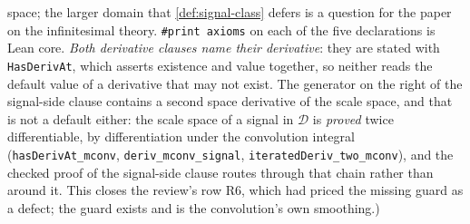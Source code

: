 \begin{proposition}
{space; the larger domain that \ref{def:signal-class} defers is a question for the paper on
the infinitesimal theory. \texttt{\#print axioms} on each of the five declarations is Lean
core. \emph{Both derivative clauses name their derivative}: they are stated with
\texttt{HasDerivAt}, which asserts existence and value together, so neither reads the default
value of a derivative that may not exist. The generator on the right of the signal-side clause
contains a second space derivative of the scale space, and that is not a default either: the
scale space of a signal in $\mathcal{D}$ is \emph{proved} twice differentiable, by
differentiation under the convolution integral
(\texttt{hasDerivAt\_mconv}, \texttt{deriv\_mconv\_signal},
\texttt{iteratedDeriv\_two\_mconv}), and the checked proof of the signal-side clause routes
through that chain rather than around it. This closes the review's row R6, which had priced
the missing guard as a defect; the guard exists and is the convolution's own smoothing.)}
\end{proposition}

